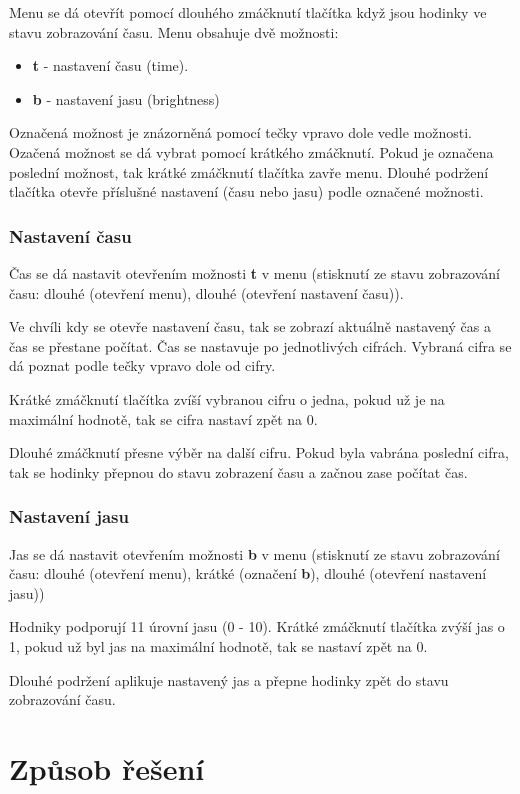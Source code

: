 \documentclass{article}
\begin{document}
Menu se dá otevřít pomocí dlouhého zmáčknutí tlačítka když jsou hodinky ve
stavu zobrazování času. Menu obsahuje dvě možnosti:
\begin{itemize}
    \item \textbf{t} - nastavení času (time).
    \item \textbf{b} - nastavení jasu (brightness)
\end{itemize}
Označená možnost je znázorněná pomocí tečky vpravo dole vedle možnosti. Ozačená
možnost se dá vybrat pomocí krátkého zmáčknutí. Pokud je označena poslední
možnost, tak krátké zmáčknutí tlačítka zavře menu. Dlouhé podržení tlačítka
otevře příslušné nastavení (času nebo jasu) podle označené možnosti.

\subsubsection{Nastavení času}

Čas se dá nastavit otevřením možnosti \textbf{t} v menu (stisknutí ze stavu
zobrazování času: dlouhé (otevření menu), dlouhé (otevření nastavení času)).

Ve chvíli kdy se otevře nastavení času, tak se zobrazí aktuálně nastavený čas
a čas se přestane počítat. Čas se nastavuje po jednotlivých cifrách. Vybraná
cifra se dá poznat podle tečky vpravo dole od cifry.

Krátké zmáčknutí tlačítka zvíší vybranou cifru o jedna, pokud už je na
maximální hodnotě, tak se cifra nastaví zpět na 0.

Dlouhé zmáčknutí přesne výběr na další cifru. Pokud byla vabrána poslední
cifra, tak se hodinky přepnou do stavu zobrazení času a začnou zase počítat
čas.

\subsubsection{Nastavení jasu}

Jas se dá nastavit otevřením možnosti \textbf{b} v menu (stisknutí ze stavu
zobrazování času: dlouhé (otevření menu), krátké (označení \textbf{b}), dlouhé
(otevření nastavení jasu))

Hodniky podporují 11 úrovní jasu (0 - 10). Krátké zmáčknutí tlačítka zvýší jas
o 1, pokud už byl jas na maximální hodnotě, tak se nastaví zpět na 0.

Dlouhé podržení aplikuje nastavený jas a přepne hodinky zpět do stavu
zobrazování času.

\section{Způsob řešení}
\end{document}
